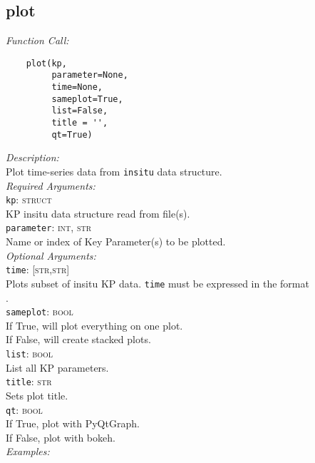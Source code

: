 \documentclass{article}
\begin{document}
\subsection{plot}
\label{subsec:plot}
\vspace{-5mm}
\textit{Function Call:}\\
\vspace{-10mm}
\begin{verbatim}
    plot(kp, 
         parameter=None, 
         time=None,
         sameplot=True, 
         list=False, 
         title = '', 
         qt=True)
\end{verbatim}
\vspace{-5mm}
\noindent
\textit{Description:}\\
\indent Plot time-series data from \texttt{insitu} data structure.\\
\textit{Required Arguments:}\\
\indent \texttt{kp}: \textsc{struct}\\
\indent \indent KP insitu data structure read from file(s).\\ 
\indent \texttt{parameter}: \textsc{int, str}\\
\indent \indent Name or index of Key Parameter(s) to be plotted.\\
\textit{Optional Arguments:}\\
\indent \texttt{time}: \textsc{[str,str]}\\
\indent \indent Plots subset of insitu KP data. \texttt{time} must be expressed in the format \\
\indent {}.\\
\indent \texttt{sameplot}: \textsc{bool}\\
\indent \indent If True, will plot everything on one plot.\\
\indent \indent If False, will create stacked plots.\\
\indent \texttt{list}: \textsc{bool}\\
\indent \indent List all KP parameters.\\
\indent \texttt{title}: \textsc{str}\\
\indent \indent Sets plot title.\\ 
\indent \texttt{qt}: \textsc{bool}\\
\indent \indent If True, plot with PyQtGraph.\\
\indent \indent If False, plot with bokeh.\\
\noindent \textit{Examples:}\\
\end{document}
